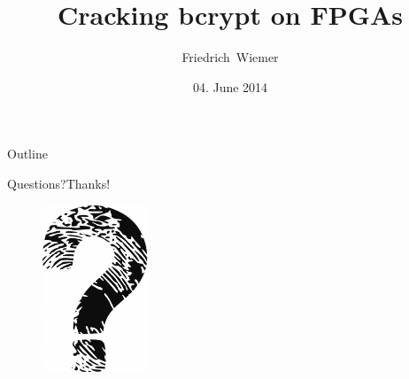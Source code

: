 \documentclass[12pt]{beamer}
\title{Cracking bcrypt on FPGAs}
\subtitle{}
\author{Friedrich~Wiemer}
\institute[Ruhr University Bochum]
{%
  FluxFingers\\
  Ruhr University Bochum
}
\date{04. June 2014}
\begin{document}
\begin{frame}
    \titlepage{}
\end{frame}

\begin{frame}{Outline}
  \tableofcontents
\end{frame}



\begin{frame}{Questions?}{Thanks!}
    \begin{figure}[!htb]
        \includegraphics[height=50mm]{data/questions.png}
    \end{figure}
\end{frame}
\end{document}
